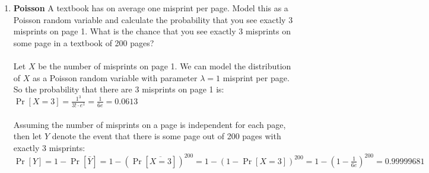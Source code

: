\documentclass[11pt,fleqn]{article}
\begin{document}
\begin{enumerate}
\newpage
\item \textbf{Poisson}
A textbook has on average one misprint per page. Model this as a Poisson random variable and calculate the probability that you see exactly 3 misprints on page 1. What is the chance that you see exactly 3 misprints on some page in a textbook of 200 pages? \\\\
Let $X$ be the number of misprints on page 1. We can model the distribution of $X$ as a Poisson random variable with parameter $\lambda = 1$ misprint per page. So the probability that there are 3 misprints on page 1 is: $\displaystyle\Pr[X=3] = \frac{1^3}{3!\cdot e^1} = \frac1{6e} = 0.0613$ \\\\
Assuming the number of misprints on a page is independent for each page, then let $Y$ denote the event that there is some page out of 200 pages with exactly 3 misprints: $\Pr[Y] = 1-\Pr[\bar{Y}] = 1-(\Pr[\overline{X=3}])^{200} = 1-(1-\Pr[X=3])^{200} = 1-(1-\frac1{6e})^{200} = 0.99999681$


\end{enumerate}
\end{document}
